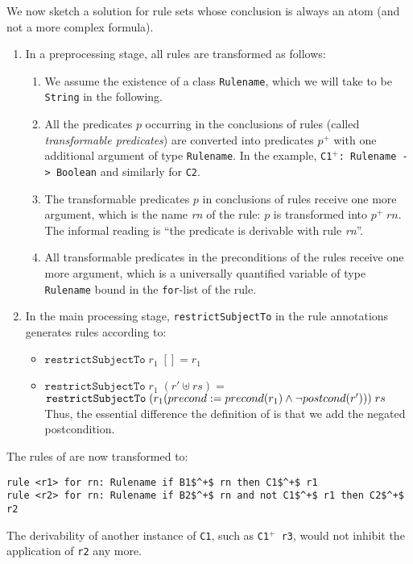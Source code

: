 We now sketch a solution for rule sets whose conclusion is always an atom (and
not a more complex formula).

\begin{enumerate}
\item In a preprocessing stage, all rules are transformed as follows:
  \begin{enumerate}
  \item We assume the existence of a class \texttt{Rulename}, which we will
    take to be \texttt{String} in the following.
  \item All the predicates $p$
    occurring in the conclusions of rules (called \emph{transformable
      predicates}) are converted into predicates $p^+$ with one additional
    argument of type \texttt{Rulename}. In the
    example, \texttt{C1$^+$: Rulename -> Boolean} and similarly for \texttt{C2}.
  \item The transformable predicates $p$ in conclusions of rules receive one
    more argument, which is the name \emph{rn} of the rule: $p$ is transformed
    into $p^+\; rn$. The informal reading is ``the predicate is derivable with
    rule \emph{rn}''.
  \item All transformable predicates in the preconditions of the rules receive
    one more argument, which is a universally quantified variable of type
    \texttt{Rulename} bound in the \texttt{for}-list of the rule.
  \end{enumerate}
\item In the main processing stage, \texttt{restrictSubjectTo} in the rule
  annotations generates rules according to:
  \begin{itemize}
\item $\mathtt{restrictSubjectTo}\; r_1\; [] = r_1$
\item $\mathtt{restrictSubjectTo}\; r_1\; (r' \uplus rs) =$\\
  $\mathtt{restrictSubjectTo}\; (r_1(precond := precond(r_1) \land \lnot postcond(r')))\; rs$
  Thus, the essential difference \wrt{} the definition of
   is that we add the negated postcondition.
\end{itemize}
\end{enumerate}

\begin{example} The rules of  are now
  transformed to:
\begin{lstlisting}[mathescape=true]
rule <r1> for rn: Rulename if B1$^+$ rn then C1$^+$ r1
rule <r2> for rn: Rulename if B2$^+$ rn and not C1$^+$ r1 then C2$^+$ r2
\end{lstlisting}
The derivability of another instance of \texttt{C1}, such as \texttt{C1$^+$ r3},
would not inhibit the application of \texttt{r2} any more.
\end{example}



